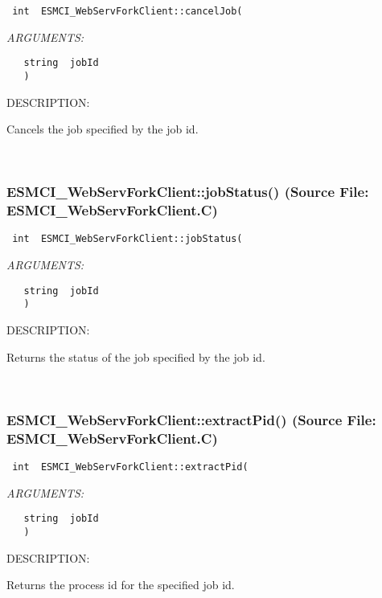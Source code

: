   
\begin{verbatim} int  ESMCI_WebServForkClient::cancelJob(\end{verbatim}{\em ARGUMENTS:}
\begin{verbatim}   string  jobId
   )\end{verbatim}
{\sf DESCRIPTION:\\ }


      Cancels the job specified by the job id.
   
 
\mbox{}\hrulefill\
 
\subsubsection{ESMCI\_WebServForkClient::jobStatus() (Source File: ESMCI\_WebServForkClient.C)}


  
\begin{verbatim} int  ESMCI_WebServForkClient::jobStatus(\end{verbatim}{\em ARGUMENTS:}
\begin{verbatim}   string  jobId
   )\end{verbatim}
{\sf DESCRIPTION:\\ }


      Returns the status of the job specified by the job id.
   
 
\mbox{}\hrulefill\
 
\subsubsection{ESMCI\_WebServForkClient::extractPid() (Source File: ESMCI\_WebServForkClient.C)}


  
\begin{verbatim} int  ESMCI_WebServForkClient::extractPid(\end{verbatim}{\em ARGUMENTS:}
\begin{verbatim}   string  jobId
   )\end{verbatim}
{\sf DESCRIPTION:\\ }


      Returns the process id for the specified job id.
  
\setlength{\parskip}{\oldparskip}
\setlength{\parindent}{\oldparindent}
\setlength{\baselineskip}{\oldbaselineskip}
